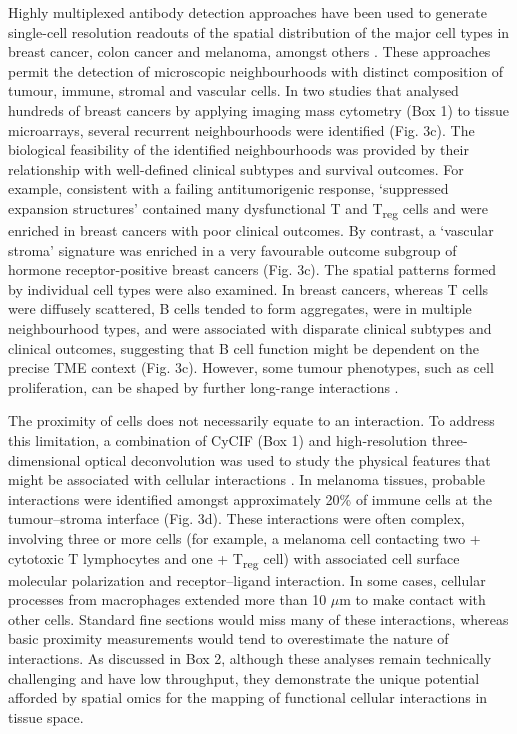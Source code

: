 Highly multiplexed antibody detection approaches have been used to generate single-cell resolution readouts of the spatial distribution of the major cell types in breast cancer, colon cancer and melanoma, amongst others \parencite{Danenberg2022-zb,Jackson2020-em,Nirmal2022-sq,Schurch2020-lp}. These approaches permit the detection of microscopic neighbourhoods with distinct composition of tumour, immune, stromal and vascular cells. In two studies that analysed hundreds of breast cancers by applying imaging mass cytometry (Box 1) to tissue microarrays, several recurrent neighbourhoods were identified \parencite{Danenberg2022-zb,Jackson2020-em} (Fig. 3c). The biological feasibility of the identified neighbourhoods was provided by their relationship with well-defined clinical subtypes and survival outcomes. For example, consistent with a failing antitumorigenic response, ‘suppressed expansion structures’ contained many dysfunctional T and T\textsubscript{reg} cells and were enriched in breast cancers with poor clinical outcomes. By contrast, a ‘vascular stroma’ signature was enriched in a very favourable outcome subgroup of hormone receptor-positive breast cancers (Fig. 3c). The spatial patterns formed by individual cell types were also examined. In breast cancers, whereas T cells were diffusely scattered, B cells tended to form aggregates, were in multiple neighbourhood types, and were associated with disparate clinical subtypes and clinical outcomes, suggesting that B cell function might be dependent on the precise TME context \parencite{Wieland2021-ep} (Fig. 3c). However, some tumour phenotypes, such as cell proliferation, can be shaped by further long-range interactions \parencite{Gaglia2022-zn}.

The proximity of cells does not necessarily equate to an interaction. To address this limitation, a combination of \ac{CyCIF} (Box 1) and high-resolution three-dimensional optical deconvolution was used to study the physical features that might be associated with cellular interactions \parencite{Nirmal2022-sq}. In melanoma tissues, probable interactions were identified amongst approximately 20\% of immune cells at the tumour–stroma interface (Fig. 3d). These interactions were often complex, involving three or more cells (for example, a melanoma cell contacting two + cytotoxic T lymphocytes and one + T\textsubscript{reg} cell) with associated cell surface molecular polarization and receptor–ligand interaction. In some cases, cellular processes from macrophages extended more than 10 $\mu$m to make contact with other cells. Standard fine sections would miss many of these interactions, whereas basic proximity measurements would tend to overestimate the nature of interactions. As discussed in Box 2, although these analyses remain technically challenging and have low throughput, they demonstrate the unique potential afforded by spatial omics for the mapping of functional cellular interactions in tissue space.

